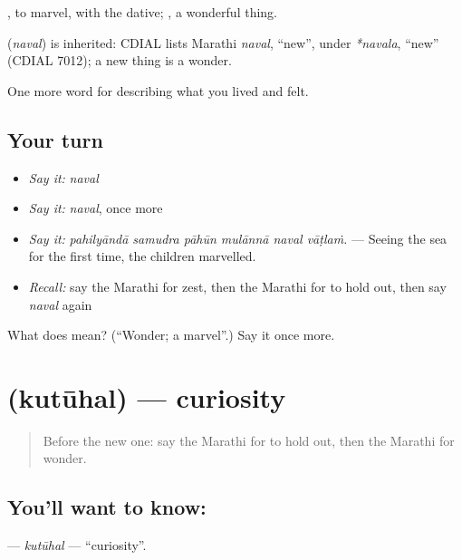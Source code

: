  , to marvel, with the dative;  , a wonderful thing.

\begin{cousinweb}
\textbf{} (\emph{naval}) is inherited: CDIAL lists Marathi \emph{naval}, \textquotedblleft{}new\textquotedblright{}, under \emph{*navala}, \textquotedblleft{}new\textquotedblright{} (CDIAL 7012); a new thing is a wonder.
\end{cousinweb}

\begin{grammarlens}[title={What you've built}]
One more word for describing what you lived and felt.
\end{grammarlens}

\subsection*{Your turn}
\begin{itemize}
\raggedright
  \item \emph{Say it:} \emph{naval}
  \item \emph{Say it:} \emph{naval}, once more
  \item \emph{Say it:} \emph{pahilyāndā samudra pāhūn mulānnā naval vāṭlaṁ.} — Seeing the sea for the first time, the children marvelled.
  \item \emph{Recall:} say the Marathi for zest, then the Marathi for to hold out, then say \emph{naval} again
\end{itemize}

\begin{tcolorbox}[breakable,colback=teal!4,colframe=teal!35!black,title={Before you move on}]
What does  mean? (\textquotedblleft{}Wonder; a marvel\textquotedblright{}.) Say it once more.
\end{tcolorbox}
\section[\texorpdfstring{\mr{कुतूहल} (kutūhal)}{कुतूहल (kutūhal)}]{ (kutūhal) — curiosity}

\label{lesson:MR-C465-kutuhal}



\begin{quote}
Before the new one: say the Marathi for to hold out, then the Marathi for wonder.
\end{quote}

\subsection*{You'll want to know: }
\textbf{} — \emph{kutūhal} — \textquotedblleft{}curiosity\textquotedblright{}.

